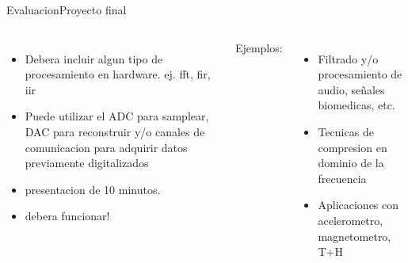  \begin{frame}{Evaluacion}{Proyecto final}
    \protoboardicon
    \begin{columns}[onlytextwidth]
       \begin{itemize}
          \item Debera incluir algun tipo de procesamiento en hardware. ej. fft, fir, iir
          \item Puede utilizar el ADC para samplear, DAC para reconstruir y/o canales de comunicacion para adquirir datos previamente digitalizados
          \item presentacion de 10 minutos.
          \item debera funcionar!
       \end{itemize}
       Ejemplos:
       \begin{itemize}
          \item Filtrado y/o procesamiento de audio, señales biomedicas, etc.
          \item Tecnicas de compresion en dominio de la frecuencia
          \item Aplicaciones con acelerometro, magnetometro, T+H
       \end{itemize}
    \end{columns}
    \vfill
 \end{frame}
